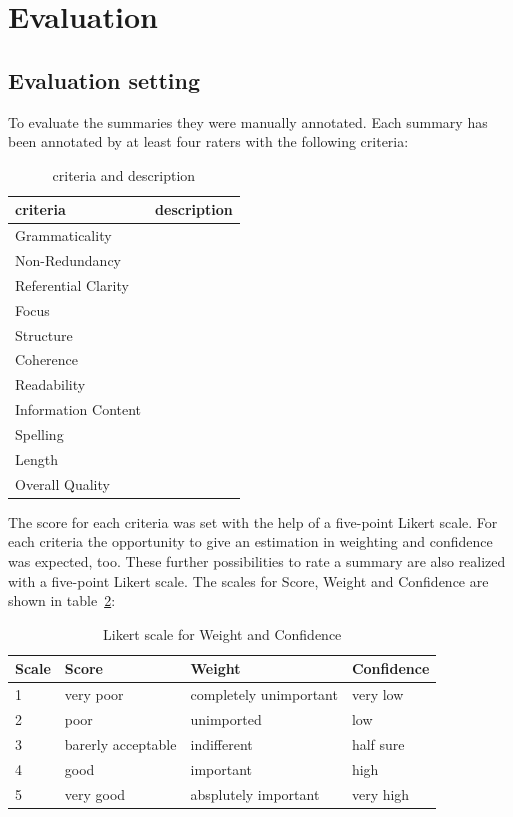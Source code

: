 
\section{Evaluation}
\label{ch:evaluation}

\subsection{Evaluation setting}
To evaluate the summaries they were manually annotated.
Each summary has been annotated by at least four raters with the following criteria:

\begin{table}[H]
	\begin{tabularx}{\textwidth}{l|X} \toprule
		criteria            & description \\ \midrule
		Grammaticality      & \\
		Non-Redundancy      & \\
		Referential Clarity & \\
		Focus               & \\
		Structure           & \\
		Coherence           & \\
		Readability         & \\
		Information Content & \\
		Spelling            & \\
		Length              & \\
		Overall Quality     & \\  \bottomrule    
	\end{tabularx}
	\caption{criteria and description}
	\label{tab:evacriteria}
\end{table}


The score for each criteria was set with the help of a five-point Likert scale.
For each criteria the opportunity to give an estimation in weighting and confidence was expected, too. These further possibilities to rate a summary are also realized with a five-point Likert scale.
The scales for Score, Weight and Confidence are shown in table~\ref{tab:evalikert}:

\begin{table}[H]
	\begin{tabularx}{\textwidth}{l|XXX} \toprule
		Scale & Score & Weight & Confidence \\ \midrule
		1 & very poor & completely unimportant & very low \\
		2 & poor & unimported & low \\
		3 & barerly acceptable & indifferent & half sure \\
		4 & good & important & high \\
		5 & very good & absplutely important & very high \\ \bottomrule    
	\end{tabularx}
	\caption{Likert scale for Weight and Confidence}
	\label{tab:evalikert}
\end{table}

